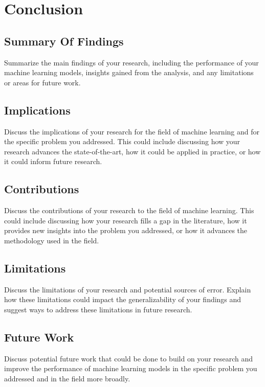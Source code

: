 
\section{Conclusion}
\label{sec: Conclusion}


\subsection{Summary Of Findings}

Summarize the main findings of your research, including the performance of your machine learning models, insights gained from the analysis, and any limitations or areas for future work.

\subsection{Implications}

 Discuss the implications of your research for the field of machine learning and for the specific problem you addressed. This could include discussing how your research advances the state-of-the-art, how it could be applied in practice, or how it could inform future research.
 
\subsection{Contributions}

Discuss the contributions of your research to the field of machine learning. This could include discussing how your research fills a gap in the literature, how it provides new insights into the problem you addressed, or how it advances the methodology used in the field.

\subsection{Limitations}

Discuss the limitations of your research and potential sources of error. Explain how these limitations could impact the generalizability of your findings and suggest ways to address these limitations in future research.

\subsection{Future Work}

Discuss potential future work that could be done to build on your research and improve the performance of machine learning models in the specific problem you addressed and in the field more broadly.